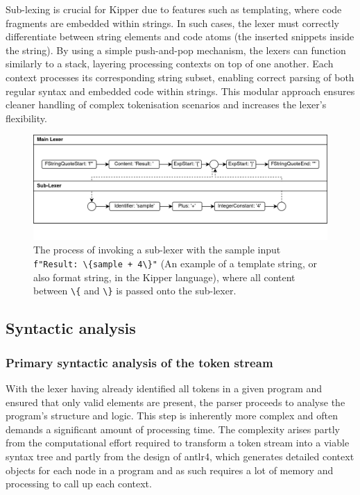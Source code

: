 Sub-lexing is crucial for Kipper due to features such as templating, where code fragments are embedded within strings. In such cases, the lexer must correctly differentiate between string elements and code atoms (the inserted snippets inside the string). By using a simple push-and-pop mechanism, the lexers can function similarly to a stack, layering processing contexts on top of one another. Each context processes its corresponding string subset, enabling correct parsing of both regular syntax and embedded code within strings. This modular approach ensures cleaner handling of complex tokenisation scenarios and increases the lexer's flexibility.

\begin{figure}[h!]
	\centering
	\includegraphics[scale=0.85]{./pics/Sub-Lexer.drawio}
	\caption{The process of invoking a sub-lexer with the sample input \lstinline|f"Result: \{sample + 4\}"| (An example of a template string, or also format string, in the Kipper language), where all content between \lstinline|\{| and \lstinline|\}| is passed onto the sub-lexer.}
	\label{fig:implementation:sub-lexer}
\end{figure}

\subsection{Syntactic analysis}

\subsubsection{Primary syntactic analysis of the token stream}

With the lexer having already identified all tokens in a given program and ensured that only valid elements are present, the parser proceeds to analyse the program's structure and logic. This step is inherently more complex and often demands a significant amount of processing time. The complexity arises partly from the computational effort required to transform a token stream into a viable syntax tree and partly from the design of \Gls{antlr4}, which generates detailed context objects for each node in a program and as such requires a lot of memory and processing to call up each context.

